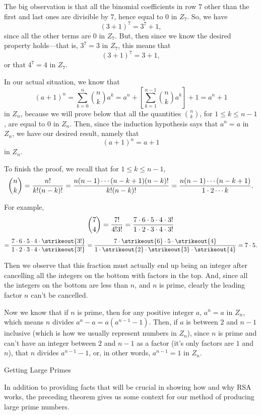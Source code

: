 The big observation is that all the binomial coefficients in row $7$
other than the first and last ones
are divisible by $7$, hence equal to $0$ in $Z_7$.
So, we have
$$
(3+1)^7 = 3^7 + 1,
$$
since all the other terms are $0$ in $Z_7$.
But, then since we know the desired property holds---that is, $3^7 = 3$ in $Z_7$,
this means that
$$
(3+1)^7 = 3+1,
$$
or that $4^7 = 4$ in $Z_7$.
\medskip
\Outdent

In our actual situation, we know that
$$
(a+1)^n = \sum_{k=0}^{n} {n \choose k} a^k
= a^n + \left[ \sum_{k=1}^{n-1} {n \choose k} a^k \right] + 1
= a^n + 1
$$
in $Z_n$, because we will prove below that all the quantities $n \choose k$, for $1\leq k \leq n-1$,
are equal to $0$ in $Z_n$.
Then, since the induction hypothesis says that $a^n = a$ in $Z_n$, 
we have our desired result, namely that
$$
(a+1)^n = a +1
$$
in $Z_n$.
\medskip

To finish the proof, we recall that for $1\leq k \leq n-1$,
$$
{n \choose k} = { n! \over k! (n-k)! } = { n (n-1) \cdots (n-k+1) (n-k)! \over k! (n-k)! }
= { n (n-1) \cdots (n-k+1) \over 1 \cdot 2 \cdots k}.
$$
\medskip

For example, 
$$
{7 \choose 4 } = {7!  \over 4! 3!   } = { 7 \cdot 6 \cdot 5 \cdot 4 \cdot 3! \over 1 \cdot 2 \cdot 3 \cdot 4 \cdot 3! }
$$
$$ = { 7 \cdot 6 \cdot 5 \cdot 4 \cdot \strikeout{3!} \over 1 \cdot 2 \cdot 3 \cdot 4 \cdot \strikeout{3!} }
= { 7 \cdot \strikeout{6} \cdot 5 \cdot \strikeout{4} \over 1 \cdot \strikeout{2} \cdot \strikeout{3} \cdot \strikeout{4} } = 7 \cdot 5.
$$
\medskip
\Outdent

Then we observe that this fraction must actually end up being an integer after cancelling
all the integers on the bottom with factors in the top.  And, since all the integers on the bottom
are less than $n$, and $n$ is prime, clearly the leading factor $n$ can't be cancelled.
\border
\Outdent

Now we know that 
if $n$ is prime, then
for any positive integer $a$,
$a^n = a$ in $Z_n$, which means $n$ divides $a^n-a = a(a^{n-1} - 1)$.
Then, if $a$ is between $2$ and $n-1$ inclusive (which is how we usually represent
numbers in $Z_n$),
since $n$ is prime and can't have an integer between $2$ and $n-1$
as a factor (it's only factors are $1$ and $n$), that
$n$ divides $a^{n-1} -1 $, or, in other words, $a^{n-1} = 1$ in $Z_n$.
\border

{\bigboldfont Getting Large Primes}
\medskip

In addition to providing facts that will be crucial in showing how and why RSA works,
the preceding theorem gives us some context for our method of producing large prime
numbers.
\medskip

